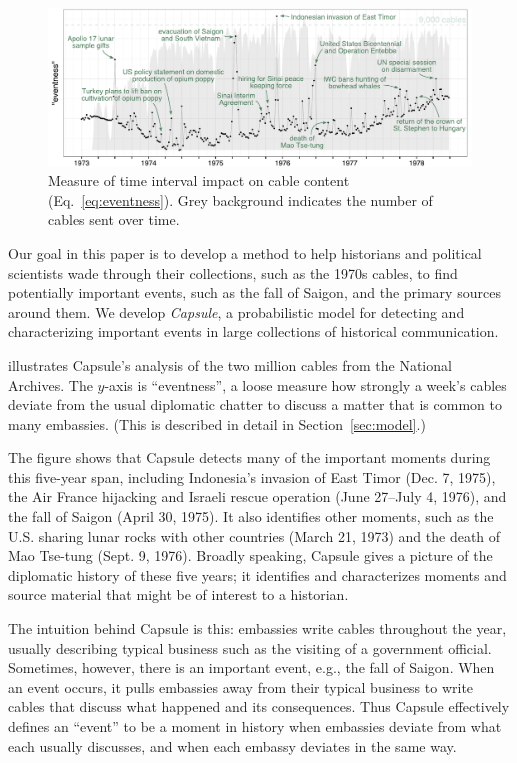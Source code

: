 \begin{figure}[ht]
\centering
\includegraphics[width=\linewidth]{fig/cables_events.pdf}
\caption{Measure of time interval impact on cable content (Eq.~\ref{eq:eventness}).  Grey background indicates the number of cables sent over time.}
\label{fig:cables_events}
\end{figure}

Our goal in this paper is to develop a method to help historians and
political scientists wade through their collections, such as the 1970s
cables, to find potentially important events, such as the fall of
Saigon, and the primary sources around them. We develop
\textit{Capsule}, a probabilistic model for detecting and
characterizing important events in large collections of historical
communication.

 illustrates Capsule's analysis of the two
million cables from the National Archives. The \mbox{$y$-axis} is
``eventness'', a loose measure how strongly a week's cables deviate
from the usual diplomatic chatter to discuss a matter that is common
to many embassies. (This is described in detail in Section~\ref{sec:model}.)

The figure shows that Capsule detects many of the important moments
during this five-year span, including Indonesia's invasion of East
Timor (Dec. 7, 1975), the Air France hijacking and Israeli rescue operation
(June 27--July 4, 1976), and the fall of Saigon (April 30, 1975). It also identifies other moments,
such as the U.S. sharing lunar rocks with other countries (March 21, 1973) and
the death of Mao Tse-tung (Sept. 9, 1976). Broadly speaking, Capsule gives a
picture of the diplomatic history of these five years; it identifies
and characterizes moments and source material that might be of
interest to a historian.

The intuition behind Capsule is this: embassies write cables
throughout the year, usually describing typical business such as the
visiting of a government official. Sometimes, however, there is an
important event, e.g., the fall of Saigon. When an event occurs, it
pulls embassies away from their typical business to write cables that
discuss what happened and its consequences. Thus Capsule effectively
defines an ``event'' to be a moment in history when embassies deviate
from what each usually discusses, and when each embassy deviates in
the same way.

